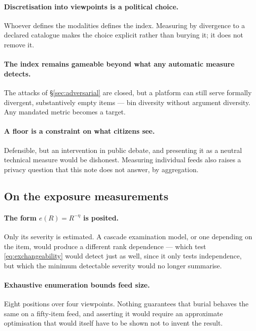 \documentclass[11pt,a4paper]{article}
\begin{document}
\paragraph{Discretisation into viewpoints is a political choice.} Whoever defines the modalities
defines the index. Measuring by divergence to a declared catalogue makes the choice explicit
rather than burying it; it does not remove it.

\paragraph{The index remains gameable beyond what any automatic measure detects.} The attacks of
\S\ref{sec:adversarial} are closed, but a platform can still serve formally divergent,
substantively empty items --- bin diversity without argument diversity. Any mandated metric
becomes a target.

\paragraph{A floor is a constraint on what citizens see.} Defensible, but an intervention in
public debate, and presenting it as a neutral technical measure would be dishonest. Measuring
individual feeds also raises a privacy question that this note does not answer,
by aggregation.

\subsection{On the exposure measurements}

\paragraph{The form $e(R) = R^{-\eta}$ is posited.} Only its severity is estimated. A cascade
examination model, or one depending on the item, would produce a different rank dependence ---
which test \eqref{eq:exchangeability} would detect just as well, since it only tests
independence, but which the minimum detectable severity would no longer summarise.

\paragraph{Exhaustive enumeration bounds feed size.} Eight positions over four viewpoints.
Nothing guarantees that burial behaves the same on a fifty-item feed, and asserting it would
require an approximate optimisation that would itself have to be shown not to invent the result.
\end{document}
